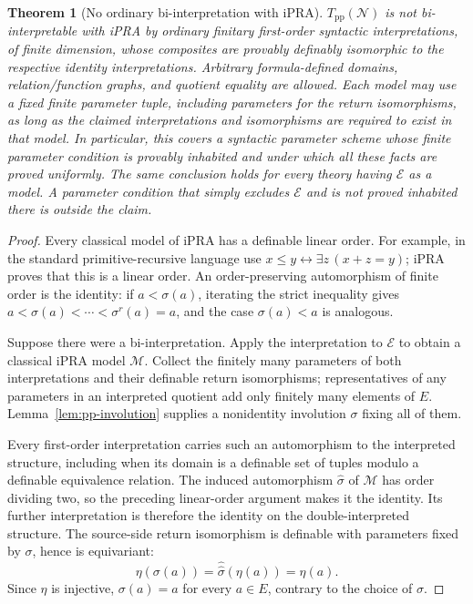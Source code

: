 \documentclass[11pt,letterpaper]{article}
\newtheorem{theorem}{Theorem}[section]
\theoremstyle{definition}\newtheorem{definition}[theorem]{Definition}
\theoremstyle{remark}\newtheorem{remark}[theorem]{Remark}
\begin{document}
\begin{theorem}[No ordinary bi-interpretation with iPRA]
\label{thm:pp-obstruction}
$T_{\mathrm{pp}}(\mathcal N)$ is not bi-interpretable with iPRA by
ordinary finitary first-order syntactic interpretations, of finite
dimension, whose composites are provably definably isomorphic to the
respective identity interpretations.  Arbitrary formula-defined domains,
relation/function graphs, and quotient equality are allowed.  Each
model may use a fixed finite parameter tuple, including parameters for
the return isomorphisms, as long as the claimed interpretations and
isomorphisms are required to exist in that model.  In particular, this
covers a syntactic parameter scheme whose finite parameter condition is
provably inhabited and under which all these facts are proved uniformly.
The same conclusion holds for every theory having $\mathcal E$ as a
model.  A parameter condition that simply excludes $\mathcal E$ and is
not proved inhabited there is outside the claim.
\end{theorem}
\begin{proof}
Every classical model of iPRA has a definable linear order.  For example,
in the standard primitive-recursive language use
$x\le y\leftrightarrow\exists z\,(x+z=y)$; iPRA proves that this
is a linear order.  An order-preserving automorphism of finite order is
the identity: if $a<\sigma(a)$, iterating the strict inequality gives
$a<\sigma(a)<\cdots<\sigma^r(a)=a$, and the case
$\sigma(a)<a$ is analogous.

Suppose there were a bi-interpretation.  Apply the interpretation to
$\mathcal E$ to obtain a classical iPRA model $\mathcal M$.
Collect the finitely many parameters of both interpretations and their
definable return isomorphisms; representatives of any parameters in an
interpreted quotient add only finitely many elements of $E$.
Lemma~\ref{lem:pp-involution} supplies a nonidentity involution
$\sigma$ fixing all of them.

Every first-order interpretation carries such an automorphism to the
interpreted structure, including when its domain is a definable set of
tuples modulo a definable equivalence relation.  The induced
automorphism $\widehat\sigma$ of $\mathcal M$ has order dividing
two, so the preceding linear-order argument makes it the identity.
Its further interpretation is therefore the identity on the
double-interpreted structure.  The source-side return isomorphism is
definable with parameters fixed by $\sigma$, hence is equivariant:
\[
 \eta(\sigma(a))=\widehat{\widehat\sigma}(\eta(a))=\eta(a).
\]
Since $\eta$ is injective, $\sigma(a)=a$ for every $a\in E$,
contrary to the choice of $\sigma$.
\end{proof}
\end{document}
